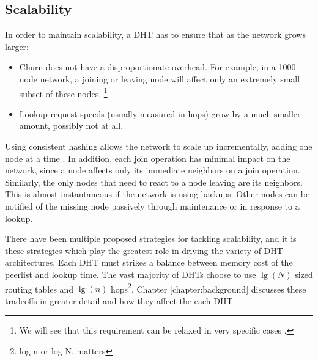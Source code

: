 \documentclass[10pt,letterpaper,twoside]{report}
\begin{document}
\subsection{Scalability}
\label{subsec:scalability}
In order to maintain scalability, a DHT has to ensure that as the network grows larger:

\begin{itemize}
    \item Churn does not have a disproportionate overhead.  
    For example, in a 1000 node network, a joining or leaving node will affect only an extremely small subset of these nodes.
    \footnote{We will see that this requirement can  be  relaxed in  very specific cases \cite{li2013zht}.}
    \item Lookup request speeds (usually measured in hops) grow by a much smaller amount, possibly not at all.
\end{itemize}

Using consistent hashing allows the network to scale up incrementally, adding one node at a time \cite{dynamo}.
In addition, each join operation has minimal impact on the network, since a node affects only its immediate neighbors on a join operation.
Similarly, the only nodes that need to react to a node leaving are its neighbors.
This is almost instantaneous if the network is using backups.
Other nodes can be notified of the missing node passively through maintenance or in response to a lookup.

There have been multiple proposed strategies for tackling scalability, and it is these strategies which play the greatest role in driving the variety of DHT architectures. 
Each DHT must strikes a balance between memory cost of the peerlist and lookup time. 
The vast majority of DHTs choose to use $\lg(N)$ sized routing tables and  $\lg(n)$ hops\footnote{log n or log N, matters}. 
Chapter \ref{chapter:background} discusses these tradeoffs in greater detail and how they affect the each DHT.
\end{document}
